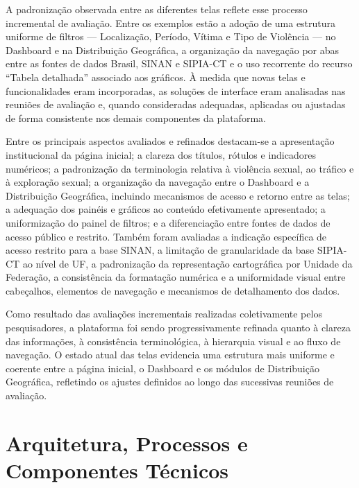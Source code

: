 \documentclass[11pt,a4paper]{article}
\begin{document}
A padronização observada entre as diferentes telas reflete esse processo incremental de avaliação. Entre os exemplos estão a adoção de uma estrutura uniforme de filtros — Localização, Período, Vítima e Tipo de Violência — no Dashboard e na Distribuição Geográfica, a organização da navegação por abas entre as fontes de dados Brasil, SINAN e SIPIA-CT e o uso recorrente do recurso “Tabela detalhada” associado aos gráficos. À medida que novas telas e funcionalidades eram incorporadas, as soluções de interface eram analisadas nas reuniões de avaliação e, quando consideradas adequadas, aplicadas ou ajustadas de forma consistente nos demais componentes da plataforma.

Entre os principais aspectos avaliados e refinados destacam-se a apresentação institucional da página inicial; a clareza dos títulos, rótulos e indicadores numéricos; a padronização da terminologia relativa à violência sexual, ao tráfico e à exploração sexual; a organização da navegação entre o Dashboard e a Distribuição Geográfica, incluindo mecanismos de acesso e retorno entre as telas; a adequação dos painéis e gráficos ao conteúdo efetivamente apresentado; a uniformização do painel de filtros; e a diferenciação entre fontes de dados de acesso público e restrito. Também foram avaliadas a indicação específica de acesso restrito para a base SINAN, a limitação de granularidade da base SIPIA-CT ao nível de UF, a padronização da representação cartográfica por Unidade da Federação, a consistência da formatação numérica e a uniformidade visual entre cabeçalhos, elementos de navegação e mecanismos de detalhamento dos dados.

Como resultado das avaliações incrementais realizadas coletivamente pelos pesquisadores, a plataforma foi sendo progressivamente refinada quanto à clareza das informações, à consistência terminológica, à hierarquia visual e ao fluxo de navegação. O estado atual das telas evidencia uma estrutura mais uniforme e coerente entre a página inicial, o Dashboard e os módulos de Distribuição Geográfica, refletindo os ajustes definidos ao longo das sucessivas reuniões de avaliação.

\clearpage
\section{Arquitetura, Processos e Componentes Técnicos}
\label{sec:arquitetura}
\end{document}
